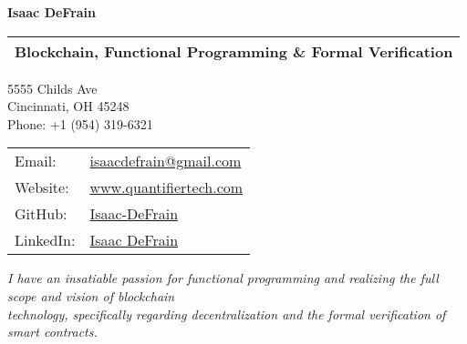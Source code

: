 \documentclass[letterpaper,10pt,oneside]{article}
\begin{document}

\begin{center}
\Huge{\textbf{Isaac DeFrain}}
\end{center}

\begin{center}
\noindent \begin{tabular}{l}
\Large{Blockchain, Functional Programming \& Formal Verification} \\
\hline
\end{tabular}
\end{center}
\vspace{-2ex}
\normalsize


\begin{center}
\begin{minipage}{0.3\textwidth}
\vfill
5555 Childs Ave \\
Cincinnati, OH 45248 \\
Phone: +1 (954) 319-6321
\vfill
\end{minipage}
\begin{minipage}{0.35\textwidth}
\begin{tabular}{@{} l l}
Email: & \href{mailto:isaacdefrain@gmail.com}{isaacdefrain@gmail.com} \\
Website: & \href{https://www.quantifiertech.com}{www.quantifiertech.com} \\
GitHub: & \href{https://github.com/Isaac-DeFrain?tab=repositories}{Isaac-DeFrain} \\
LinkedIn: & \href{https://www.linkedin.com/in/isaac-defrain-a4046b65/}{Isaac DeFrain}
\end{tabular}
\end{minipage}
\end{center}


\begin{center}
\emph{I have an insatiable passion for functional programming and realizing the full scope and vision of blockchain} \\
\emph{technology, specifically regarding decentralization and the formal verification of smart contracts.}
\end{center}
\end{document}
